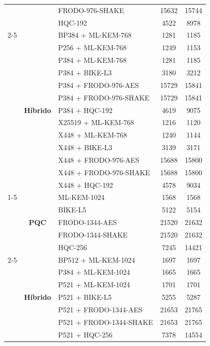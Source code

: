 \documentclass[10pt]{article}
\begin{document}
\begin{tabular}{@{}c c l c c@{}}
 &  & FRODO-976-SHAKE & 15632 & 15744 \\
 &  & HQC-192 & 4522 & 8978 \\
\cmidrule(lr){2-5}
 & \multirow[c]{13}{*}{\textbf{Híbrido}} & BP384 + ML-KEM-768 & 1281 & 1185 \\
 &  & P256 + ML-KEM-768 & 1249 & 1153 \\
 &  & P384 + ML-KEM-768 & 1281 & 1185 \\
 &  & P384 + BIKE-L3 & 3180 & 3212 \\
 &  & P384 + FRODO-976-AES & 15729 & 15841 \\
 &  & P384 + FRODO-976-SHAKE & 15729 & 15841 \\
 &  & P384 + HQC-192 & 4619 & 9075 \\
 &  & X25519 + ML-KEM-768 & 1216 & 1120 \\
 &  & X448 + ML-KEM-768 & 1240 & 1144 \\
 &  & X448 + BIKE-L3 & 3139 & 3171 \\
 &  & X448 + FRODO-976-AES & 15688 & 15800 \\
 &  & X448 + FRODO-976-SHAKE & 15688 & 15800 \\
 &  & X448 + HQC-192 & 4578 & 9034 \\
\cmidrule(lr){1-5}
\multirow[c]{12}{*}{\textbf{V}} & \multirow[c]{5}{*}{\textbf{PQC}} & ML-KEM-1024 & 1568 & 1568 \\
 &  & BIKE-L5 & 5122 & 5154 \\
 &  & FRODO-1344-AES & 21520 & 21632 \\
 &  & FRODO-1344-SHAKE & 21520 & 21632 \\
 &  & HQC-256 & 7245 & 14421 \\
\cmidrule(lr){2-5}
 & \multirow[c]{7}{*}{\textbf{Híbrido}} & BP512 + ML-KEM-1024 & 1697 & 1697 \\
 &  & P384 + ML-KEM-1024 & 1665 & 1665 \\
 &  & P521 + ML-KEM-1024 & 1701 & 1701 \\
 &  & P521 + BIKE-L5 & 5255 & 5287 \\
 &  & P521 + FRODO-1344-AES & 21653 & 21765 \\
 &  & P521 + FRODO-1344-SHAKE & 21653 & 21765 \\
 &  & P521 + HQC-256 & 7378 & 14554 \\
\bottomrule
\end{tabular}
\end{document}
